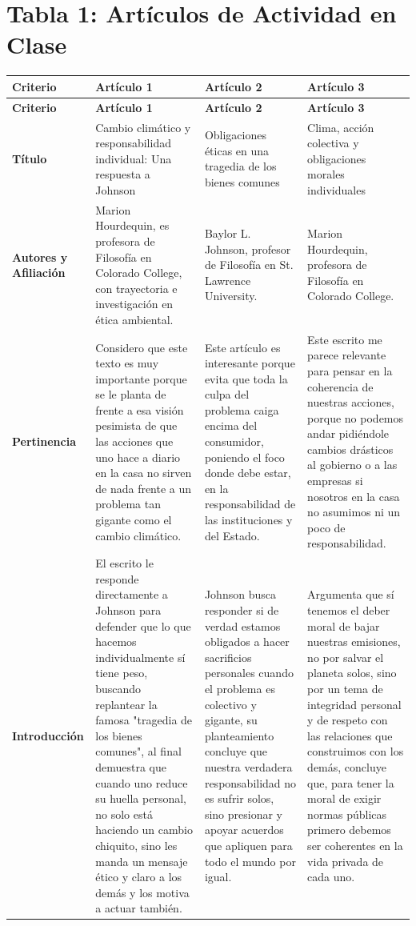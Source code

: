 \documentclass[12pt]{article}
\begin{document}
\section*{Tabla 1: Artículos de Actividad en Clase}

\begin{longtable}{|>{\raggedright\arraybackslash}p{3cm}|>{\raggedright\arraybackslash}p{4.2cm}|>{\raggedright\arraybackslash}p{4.2cm}|>{\raggedright\arraybackslash}p{4.2cm}|}
\hline
\textbf{Criterio} & \textbf{Artículo 1} & \textbf{Artículo 2} & \textbf{Artículo 3} \\
\hline
\endfirsthead

\hline
\textbf{Criterio} & \textbf{Artículo 1} & \textbf{Artículo 2} & \textbf{Artículo 3} \\
\hline
\endhead

\textbf{Título} & Cambio climático y responsabilidad individual: Una respuesta a Johnson & Obligaciones éticas en una tragedia de los bienes comunes & Clima, acción colectiva y obligaciones morales individuales \\
\hline
\textbf{Autores y Afiliación} & Marion Hourdequin, es profesora de Filosofía en Colorado College, con trayectoria e investigación en ética ambiental. & Baylor L. Johnson, profesor de Filosofía en St. Lawrence University. & Marion Hourdequin, profesora de Filosofía en Colorado College. \\
\hline
\textbf{Pertinencia} & Considero que este texto es muy importante porque se le planta de frente a esa visión pesimista de que las acciones que uno hace a diario en la casa no sirven de nada frente a un problema tan gigante como el cambio climático. & Este artículo es interesante porque evita que toda la culpa del problema caiga encima del consumidor, poniendo el foco donde debe estar, en la responsabilidad de las instituciones y del Estado. & Este escrito me parece relevante para pensar en la coherencia de nuestras acciones, porque no podemos andar pidiéndole cambios drásticos al gobierno o a las empresas si nosotros en la casa no asumimos ni un poco de responsabilidad. \\
\hline
\textbf{Introducción} & El escrito le responde directamente a Johnson para defender que lo que hacemos individualmente sí tiene peso, buscando replantear la famosa "tragedia de los bienes comunes", al final demuestra que cuando uno reduce su huella personal, no solo está haciendo un cambio chiquito, sino les manda un mensaje ético y claro a los demás y los motiva a actuar también. & Johnson busca responder si de verdad estamos obligados a hacer sacrificios personales cuando el problema es colectivo y gigante, su planteamiento concluye que nuestra verdadera responsabilidad no es sufrir solos, sino presionar y apoyar acuerdos que apliquen para todo el mundo por igual. & Argumenta que sí tenemos el deber moral de bajar nuestras emisiones, no por salvar el planeta solos, sino por un tema de integridad personal y de respeto con las relaciones que construimos con los demás, concluye que, para tener la moral de exigir normas públicas primero debemos ser coherentes en la vida privada de cada uno. \\

\end{longtable}
\end{document}
